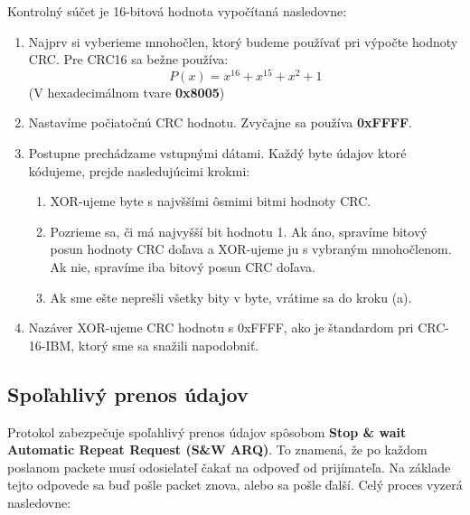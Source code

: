 \documentclass[a4paper,12pt]{article}
\begin{document}
Kontrolný súčet je 16-bitová hodnota vypočítaná nasledovne:
	\begin{enumerate}
		\item Najprv si vyberieme mnohočlen, ktorý budeme používať pri výpočte hodnoty CRC. Pre CRC16 sa bežne používa:
		\[ P(x) = x^{16} + x^{15} + x^2 + 1 \] (V hexadecimálnom tvare \textbf{0x8005})
		
		\item Nastavíme počiatočnú CRC hodnotu. Zvyčajne sa používa \textbf{0xFFFF}.
		
		\item Postupne prechádzame vstupnými dátami. Každý byte údajov ktoré kódujeme, prejde nasledujúcimi krokmi:
		\begin{enumerate}
		    \item XOR-ujeme byte s najvššími ôsmimi bitmi hodnoty CRC.
		    \item Pozrieme sa, či má najvyšší bit hodnotu 1. Ak áno, spravíme bitový posun hodnoty CRC doľava a XOR-ujeme ju s vybraným mnohočlenom. Ak nie, spravíme iba bitový posun CRC doľava. 
		    \item Ak sme ešte neprešli všetky bity v byte, vrátime sa do kroku (a).
		\end{enumerate}

		\item Nazáver XOR-ujeme CRC hodnotu s 0xFFFF, ako je štandardom pri CRC-16-IBM, ktorý sme sa snažili napodobniť.
    \end{enumerate}

    \subsection{Spoľahlivý prenos údajov}\label{prenos}
    Protokol zabezpečuje spoľahlivý prenos údajov spôsobom \textbf{Stop \& wait Automatic Repeat Request (S\&W ARQ)}. To znamená, že po každom poslanom packete musí odosielateľ čakať na odpoveď od prijímateľa. Na základe tejto odpovede sa buď pošle packet znova, alebo sa pošle ďalší. Celý proces vyzerá nasledovne:
\end{document}
